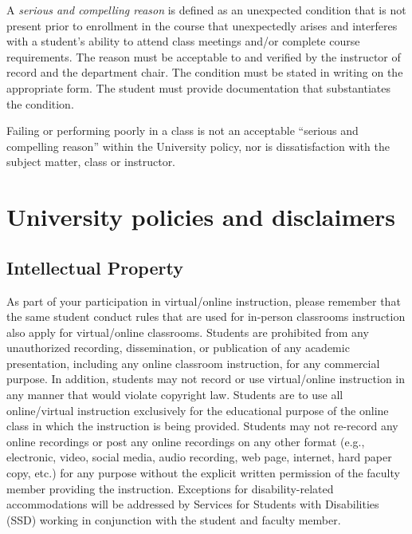 A \emph{serious and compelling reason} is defined as an unexpected
condition that is not present prior to enrollment in the course that
unexpectedly arises and interferes with a student's ability to attend
class meetings and/or complete course requirements. The reason must be
acceptable to and verified by the instructor of record and the
department chair. The condition must be stated in writing on the
appropriate form. The student must provide documentation that
substantiates the condition.

Failing or performing poorly in a class is not an acceptable ``serious
and compelling reason'' within the University policy, nor is
dissatisfaction with the subject matter, class or instructor.

\hypertarget{university-policies-and-disclaimers}{%
\section{University policies and
disclaimers}\label{university-policies-and-disclaimers}}

\hypertarget{intellectual-property}{%
\subsection{Intellectual Property}\label{intellectual-property}}

As part of your participation in virtual/online instruction, please
remember that the same student conduct rules that are used for in-person
classrooms instruction also apply for virtual/online classrooms.
Students are prohibited from any unauthorized recording, dissemination,
or publication of any academic presentation, including any online
classroom instruction, for any commercial purpose. In addition, students
may not record or use virtual/online instruction in any manner that
would violate copyright law. Students are to use all online/virtual
instruction exclusively for the educational purpose of the online class
in which the instruction is being provided. Students may not re-record
any online recordings or post any online recordings on any other format
(e.g., electronic, video, social media, audio recording, web page,
internet, hard paper copy, etc.) for any purpose without the explicit
written permission of the faculty member providing the instruction.
Exceptions for disability-related accommodations will be addressed by
Services for Students with Disabilities (SSD) working in conjunction
with the student and faculty member.

